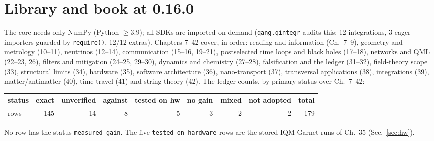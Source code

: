 \documentclass[11pt]{article}
\newcommand{\st}[1]{\texttt{#1}}
\begin{document}
\section{Library and book at 0.16.0}
The core needs only NumPy (Python $\ge3.9$); all SDKs are imported on demand (\texttt{qang.qintegr} audits this: 12 integrations, 3 eager importers guarded by \texttt{require()}, 12/12 extras). Chapters 7--42 cover, in order: reading and information (Ch.~7--9), geometry and metrology (10--11), neutrinos (12--14), communication (15--16, 19--21), postselected time loops and black holes (17--18), networks and QML (22--23, 26), filters and mitigation (24--25, 29--30), dynamics and chemistry (27--28), falsification and the ledger (31--32), field-theory scope (33), structural limits (34), hardware (35), software architecture (36), nano-transport (37), transversal applications (38), integrations (39), matter/antimatter (40), time travel (41) and string theory (42). The ledger counts, by primary status over Ch.~7--42:
\begin{center}\footnotesize
\begin{tabular}{@{}lrrrrrrrr@{}}\toprule
status & exact & unverified & against & tested on hw & no gain & mixed & not adopted & total\\\midrule
rows & 145 & 14 & 8 & 5 & 3 & 2 & 2 & 179\\\bottomrule\end{tabular}\end{center}
No row has the status \st{measured gain}. The five \st{tested on hardware} rows are the stored IQM Garnet runs of Ch.~35 (Sec.~\ref{sec:hw}).
\end{document}
